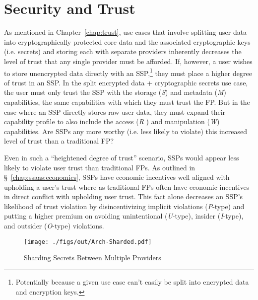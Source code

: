 \section{Security and Trust}
\label{chap:ssaas:trust}

As mentioned in Chapter~\ref{chap:trust}, use cases that involve
splitting user data into cryptographically protected core data and the
associated cryptographic keys (i.e. secrets) and storing each with
separate providers inherently decreases the level of trust that any
single provider must be afforded. If, however, a user wishes to store
unencrypted data directly with an SSP,\footnote{Potentially because a
  given use case can't easily be split into encrypted data and
  encryption keys.} they must place a higher degree of trust in an
SSP. In the split encrypted data + cryptographic secrets use case, the
user must only trust the SSP with the storage (\emph{S}) and metadata
(\emph{M}) capabilities, the same capabilities with which they must
trust the FP. But in the case where an SSP directly stores raw user
data, they must expand their capability profile to also include the
access (\emph{R} ) and manipulation (\emph{W}) capabilities. Are SSPs
any more worthy (i.e. less likely to violate) this increased level of
trust than a traditional FP?

Even in such a ``heightened degree of trust'' scenario, SSPs would
appear less likely to violate user trust than traditional FPs. As
outlined in \S~\ref{chap:ssaas:economics}, SSPs have economic
incentives well aligned with upholding a user's trust where as
traditional FPs often have economic incentives in direct conflict with
upholding user trust. This fact alone decreases an SSP's likelihood of
trust violation by disincentivizing implicit violations
(\emph{P}-type) and putting a higher premium on avoiding unintentional
(\emph{U}-type), insider (\emph{I}-type), and outsider (\emph{O}-type)
violations.

\begin{figure}[t]
  \centering
  \texttt{[image: ./figs/out/Arch-Sharded.pdf]}
  \caption{Sharding Secrets Between Multiple Providers}
  \label{fig:ssaas-sharded}
\end{figure}

